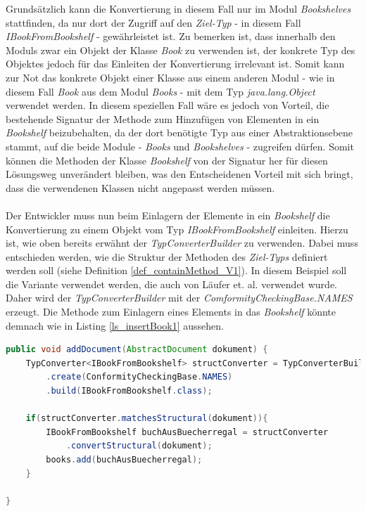 \documentclass[11pt, 
ngerman,
doublespacing,
chapterinoneline, %
consistentlayout, %
]{scrartcl}
\begin{document}
Grundsätzlich kann die Konvertierung in diesem Fall nur im Modul \emph{Bookshelves} stattfin\-den, da nur dort der Zugriff auf den \emph{Ziel-Typ} - in diesem Fall \emph{IBookFromBookshelf} - gewährleistet ist. Zu bemerken ist, dass innerhalb den Moduls zwar ein Objekt der Klasse \emph{Book} zu verwenden ist, der konkrete Typ des Objektes jedoch für das Einleiten der Konvertierung irrelevant ist. Somit kann zur Not das konkrete Objekt einer Klasse aus einem anderen Modul - wie in diesem Fall \emph{Book} aus dem Modul \emph{Books} - mit dem Typ \emph{java.lang.Object} verwendet werden. In diesem speziellen Fall wäre es jedoch von Vorteil, die bestehende Signatur der Methode zum Hinzufügen von Elementen in ein \emph{Bookshelf} beizubehalten, da der dort benötigte Typ aus einer Abstraktionsebene stammt, auf die beide Module - \emph{Books} und \emph{Bookshelves} - zugreifen dürfen. Somit können die Methoden der Klasse \emph{Bookshelf} von der Signatur her für diesen Lösungsweg unverändert bleiben, was den Entscheidenen Vorteil mit sich bringt, dass die verwendenen Klassen nicht angepasst werden müssen.\\\\
Der Entwickler muss nun beim Einlagern der Elemente in ein \emph{Bookshelf} die Konvertierung zu einem Objekt vom Typ \emph{IBookFromBookshelf} einleiten. Hierzu ist, wie oben bereits erwähnt der \emph{TypConverterBuilder} zu verwenden. Dabei muss entschieden werden, wie die Struktur der Methoden des \emph{Ziel-Typs} definiert werden soll (siehe Definition \ref{def_containMethod_V1}). In diesem Beispiel soll die Variante verwendet werden, die auch von Läufer et. al. \cite{structconfjava} verwendet wurde. Daher wird der \emph{TypConverterBuilder} mit der \linebreak\emph{ComformityCheckingBase.NAMES} erzeugt. Die Methode zum Einlagern eines Elements in das \emph{Bookshelf} könnte demnach wie in Listing \ref{ls_insertBook1} aussehen.
\begin{lstlisting}[language=Java, label=ls_insertBook1, caption=addDocument]
public void addDocument(AbstractDocument dokument) {
	TypConverter<IBookFromBookshelf> structConverter = TypConverterBuilder
		.create(ConformityCheckingBase.NAMES)
		.build(IBookFromBookshelf.class);

	if(structConverter.matchesStructural(dokument)){
		IBookFromBookshelf buchAusBuecherregal = structConverter
			.convertStructural(dokument);
		books.add(buchAusBuecherregal);
	}	
	
}
\end{lstlisting}
\end{document}
